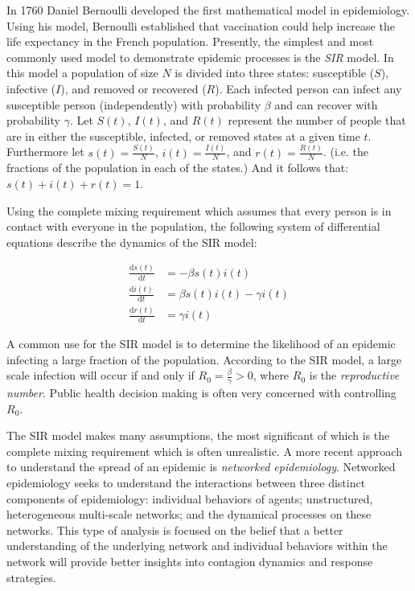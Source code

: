 \documentclass[12pt, oneside, openany]{article} %
\newcommand{\deriv}[2]{\frac{\mathrm d #1}{\mathrm d #2}}
\begin{document}
In 1760 Daniel Bernoulli developed the first mathematical model in epidemiology. Using his model, Bernoulli established that vaccination could help increase the life expectancy in the French population. Presently, the simplest and most commonly used model to demonstrate epidemic processes is the \emph{SIR} model. In this model a population of size $N$ is divided into three states: susceptible ($S$), infective ($I$), and removed or recovered ($R$). Each infected person can infect any susceptible person (independently) with probability $\beta$ and can recover with probability $\gamma$. Let $S(t)$, $I(t)$, and $R(t)$ represent the number of people that are in either the susceptible, infected, or removed states at a given time $t$. Furthermore let $s(t) = \frac{S(t)}{N}$, $i(t) = \frac{I(t)}{N}$, and $r(t) = \frac{R(t)}{N}$. (i.e. the fractions of the population in each of the states.) And it follows that: $s(t) + i(t) + r(t) = 1$. 

Using the complete mixing requirement which assumes that every person is in contact with everyone in the population, the following system of differential equations describe the dynamics of the SIR model:

\begin{align}
	\deriv{s(t)}{t} &= -\beta s(t) i(t) \\
	\deriv{i(t)}{t} &= \beta s(t) i(t) - \gamma i(t) \\
	\deriv{r(t)}{t} &= \gamma i(t)
\end{align}

A common use for the SIR model is to determine the likelihood of an epidemic infecting a large fraction of the population. According to the SIR model, a large scale infection will occur if and only if $R_{0} = \frac{\beta}{\gamma} > 0 $, where $R_{0}$ is the \textit{reproductive number}. Public health decision making is often very concerned with controlling $R_{0}$.

The SIR model makes many assumptions, the most significant of which is the complete mixing requirement which is often unrealistic. A more recent approach to understand the spread of an epidemic is \textit{networked epidemiology}. Networked epidemiology seeks to understand the interactions between three distinct components of epidemiology: individual behaviors of agents; unstructured, heterogeneous multi-scale networks; and the dynamical processes on these networks. This type of analysis is focused on the belief that a better understanding of the underlying network and individual behaviors within the network will provide better insights into contagion dynamics and response strategies. 
\end{document}
